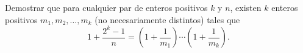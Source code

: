 Demostrar que para cualquier par de enteros positivos $k$ y $n$, existen $k$ enteros positivos $m_1, m_2, \dots , m_k$ (no necesariamente distintos) tales que
\[1+\frac{2^k-1}{n}=\left(1+\frac1{m_1}\right)\cdots \left(1+\frac1{m_k}\right).\]